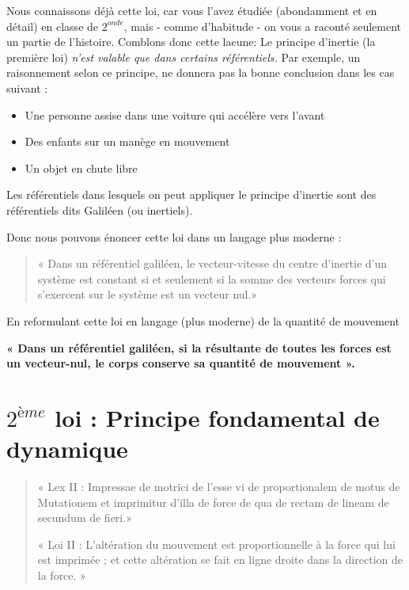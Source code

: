 \documentclass[11pt,a4paper]{article}
\begin{document}
Nous connaissons déjà cette loi, car vous l'avez étudiée (abondamment et en détail) en classe de $2^{onde}$, mais - comme d'habitude - on vous a raconté seulement un partie de l'histoire. Comblons donc cette lacune: Le principe d’inertie (la première loi) \textit{n’est valable que dans certains référentiels.} Par exemple, un raisonnement selon ce principe, ne donnera pas la bonne conclusion dans les cas suivant :
\begin{itemize}
    \item Une personne assise dans une voiture qui accélère vers l’avant
    \item Des enfants sur un manège en mouvement
    \item Un objet en chute libre
\end{itemize}

Les référentiels dans lesquels on peut appliquer le principe d’inertie sont des référentiels dits Galiléen (ou inertiels).  

Donc nous pouvons énoncer cette loi dans un langage plus moderne : 
\begin{quote}
« Dans un référentiel galiléen, le vecteur-vitesse du centre d'inertie d'un système est constant si et seulement si la somme des vecteurs forces qui s'exercent sur le système est un vecteur nul.»
\end{quote}

En reformulant cette loi en langage (plus moderne) de la quantité de mouvement 

\begin{shaded}
\textbf{« Dans un référentiel galiléen, si la résultante de toutes les forces est un vecteur-nul, le corps conserve sa quantité de mouvement ». }
\end{shaded}

\section{$2^{ème}$ loi : Principe fondamental de dynamique}%

\begin{quote}
    \centering
    \small{« Lex II : Impressae de motrici de l'esse vi de proportionalem de motus de Mutationem et imprimitur d'illa de force de qua de rectam de lineam de secundum de fieri.»}
    
    \small{« Loi II : L'altération du mouvement est proportionnelle à la force qui lui est imprimée ; et cette altération se fait en ligne droite dans la direction de la force. »}
\end{quote}
\end{document}
